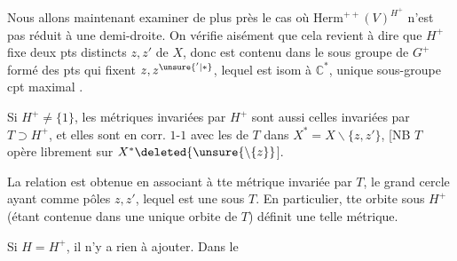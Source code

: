 
Nous allons maintenant examiner de plus près le cas où  $\mathrm{Herm}^{++}(V)^{H^+}$ n'est pas réduit à une demi-droite. On vérifie aisément que cela revient à dire que $H^+$  fixe deux pts distincts $z,z'$ de $X$, donc est contenu dans le sous groupe de $G^+$  formé des pts qui fixent $z,z^{\unsure{'|*}}$, lequel est isom à $\mathbb C^*$,   unique sous-groupe cpt maximal  . 

Si $H^+\ne\{1\}$,  les métriques invariées par $H^+$ sont aussi celles invariées par $T\supset H^+$,  et elles sont en corr. $1$-$1$ avec les   de $T$ dans $X^*=X\smallsetminus\{z,z'\}$, [NB $T$ opère librement sur $X^*\deleted{\unsure{\setminus\{z}}$].

La relation est obtenue en associant à tte métrique invariée par $T$,  le grand cercle ayant comme pôles $z,z'$, lequel est une   sous $T$. En particulier, tte orbite  sous $H^+$ (étant contenue dans une unique orbite de $T$) définit une telle métrique.

Si $H=H^+$, il n'y a  rien à ajouter. Dans le

